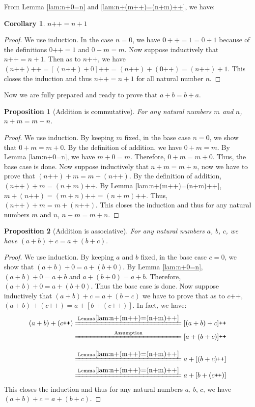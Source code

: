 \documentclass[a4paper]{book}
\newtheorem*{proof}{\textit{Proof.}}
\theoremstyle{break}
\newtheorem{corollary}{Corollary}[section]
\newtheorem{proposition}{Proposition}[section]
\begin{document}
			From Lemma \ref{lam:n+0=n} and \ref{lam:n+(m++)=(n+m)++}, we have:
			\begin{corollary}
				\label{coro:n++=n+1}
				$n\texttt{++}=n+1$
			\end{corollary}
			\begin{proof}
				We use induction. In the case $n=0$, we have $0++=1=0+1$ because of the definitions $0\texttt{++}=1$ and $0+m=m$. Now suppose inductively that $n\texttt{++}=n+1$. Then as to $n\texttt{++}$, we have $(n\texttt{++})\texttt{++}=[(n\texttt{++})+0]\texttt{++}=(n\texttt{++})+(0\texttt{++})=(n\texttt{++})+1$. This closes the induction and thus $n\texttt{++}=n+1$ for all natural number $n$.
			\end{proof}
			Now we are fully prepared and ready to prove that $a+b=b+a$.
			\begin{proposition}[Addition is commutative]
				\label{pro:addition commutative}
				For any natural numbers $m$ and $n$, $n+m=m+n$.
			\end{proposition}
			\begin{proof}
				We use induction. By keeping $m$ fixed, in the base case $n=0$, we show that $0+m=m+0$. By the definition of addition, we have $0+m=m$. By Lemma \ref{lam:n+0=n}, we have $m+0=m$. Therefore, $0+m=m+0$. Thus, the base case is done. Now suppose inductively that $n+m=m+n$, now we have to prove that $(n\texttt{++})+m=m+(n\texttt{++})$. By the definition of addition, $(n\texttt{++})+m=(n+m)\texttt{++}$. By Lemma \ref{lam:n+(m++)=(n+m)++}, $m+(n\texttt{++})=(m+n)\texttt{++}=(n+m)\texttt{++}$. Thus, $(n\texttt{++})+m=m+(n\texttt{++})$. This closes the induction and thus for any natural numbers $m$ and $n$, $n+m=m+n$.
			\end{proof}
			\begin{proposition}[Addition is associative]
				For any natural numbers $a$, $b$, $c$, we have $(a+b)+c=a+(b+c)$.
			\end{proposition}
			\begin{proof}
				We use induction. By keeping $a$ and $b$ fixed, in the base case $c=0$, we show that $(a+b)+0=a+(b+0)$. By Lemma \ref{lam:n+0=n}, $(a+b)+0=a+b$ and $a+(b+0)=a+b$. Therefore, $(a+b)+0=a+(b+0)$. Thus the base case is done. Now suppose inductively that $(a+b)+c=a+(b+c)$ we have to prove that as to $c\texttt{++}$, $(a+b)+(c\texttt{++})=a+[b+(c\texttt{++})]$. In fact, we have:
				\begin{align*}
					(a+b)+(c\texttt{++})&\xlongequal{\mathrm{Lemma \ref{lam:n+(m++)=(n+m)++}}}[(a+b)+c]\texttt{++}\\
					&\xlongequal[\phantom{\mathrm{Lemma \ref{lam:n+(m++)=(n+m)++}}}]{\mathrm{Assumption}}[a+(b+c)]\texttt{++}\\
					&\xlongequal{\mathrm{Lemma \ref{lam:n+(m++)=(n+m)++}}}a+[(b+c)\texttt{++}]\\
					&\xlongequal{\mathrm{Lemma \ref{lam:n+(m++)=(n+m)++}}}a+[b+(c\texttt{++})]
				\end{align*}
				This closes the induction and thus for any natural numbers $a$, $b$, $c$, we have $(a+b)+c=a+(b+c)$.
			\end{proof}
\end{document}
